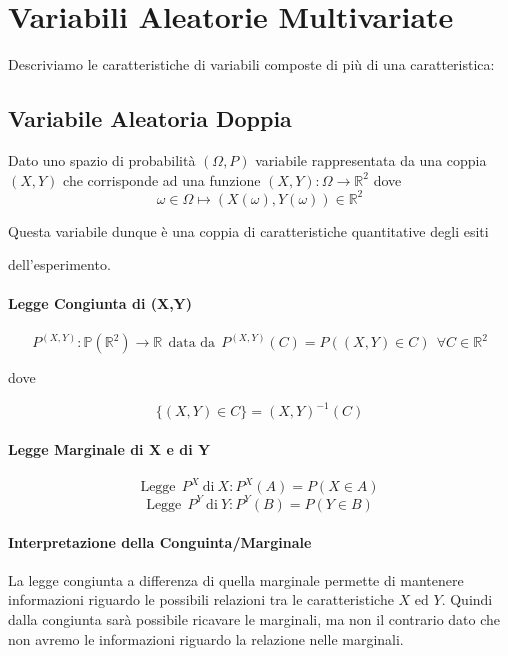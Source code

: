 \documentclass{article}
\begin{document}
\section{Variabili Aleatorie Multivariate}

Descriviamo le caratteristiche di variabili composte di più di una caratteristica:

\subsection{Variabile Aleatoria Doppia} Dato uno spazio di probabilità $(\Omega, P)$ variabile rappresentata da una coppia $(X,Y)$ che corrisponde ad una funzione $(X,Y): \Omega \rightarrow \mathbb{R}^{2}$
dove \[ \omega \in \Omega \mapsto (X(\omega), Y(\omega)) \in \mathbb{R}^{2} \]

Questa variabile dunque è una coppia di caratteristiche quantitative degli esiti 

dell'esperimento.

\paragraph{Legge Congiunta di (X,Y)} 

\[ P^{(X,Y)}: \mathbb{P}(\mathbb{R}^{2}) \rightarrow \mathbb{R} \:\: \text{data da} \:\: P^{(X,Y)}(C) = P((X,Y) \in C) \:\: \forall C \in \mathbb{R}^{2} \]
\begin{center}
    dove
\end{center}
\[ \{ (X,Y) \in C \} = (X,Y)^{-1} (C) \]

\paragraph{Legge Marginale di X e di Y}

\[ \text{Legge} \: \: P^{X} \: \text{di} \: X: P^{X}(A) = P(X \in A)  \]
\[ \text{Legge} \: \: P^{Y} \: \text{di} \: Y: P^{Y}(B) = P(Y \in B)  \]

\paragraph{Interpretazione della Conguinta/Marginale} La legge congiunta a differenza di quella marginale permette di mantenere informazioni riguardo le possibili
relazioni tra le caratteristiche $X$ ed $Y$. Quindi dalla congiunta sarà possibile ricavare le marginali, ma non il contrario dato che non avremo le informazioni riguardo la relazione nelle marginali.
\end{document}

